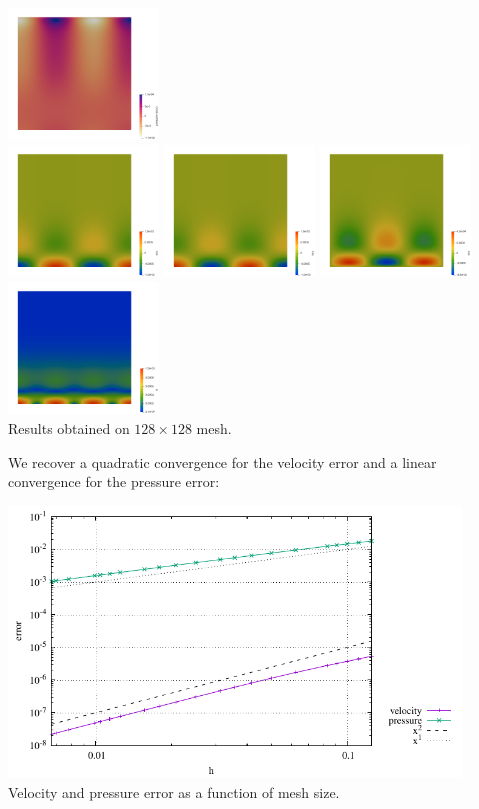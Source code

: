 \begin{center}
\includegraphics[width=4cm]{python_codes/fieldstone_06/results/press_error}\\
\includegraphics[width=4cm]{python_codes/fieldstone_06/results/exx}
\includegraphics[width=4cm]{python_codes/fieldstone_06/results/eyy}
\includegraphics[width=4cm]{python_codes/fieldstone_06/results/exy}
\includegraphics[width=4cm]{python_codes/fieldstone_06/results/sr}\\
{\captionfont Results obtained on $128 \times 128$ mesh.}
\end{center}

We recover a quadratic convergence for the velocity error and 
a linear convergence for the pressure error:

\begin{center}
\includegraphics[width=12cm]{python_codes/fieldstone_06/results/errors.pdf}\\
{\captionfont Velocity and pressure error as a function of mesh size.}
\end{center}
